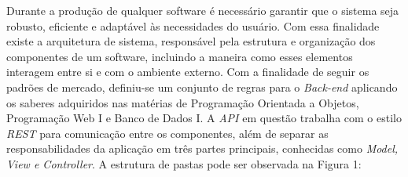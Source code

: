 Durante a produção de qualquer software é necessário garantir que o sistema seja robusto, eficiente e adaptável às necessidades do usuário. Com essa finalidade existe a arquitetura de sistema, responsável pela estrutura e organização dos componentes de um software, incluindo a maneira como esses elementos interagem entre si e com o ambiente externo. Com a finalidade de seguir os padrões de mercado, definiu-se um conjunto de regras para o \textit{Back-end} aplicando os saberes adquiridos nas matérias de Programação Orientada a Objetos, Programação Web I e Banco de Dados I. A \textit{API} em questão trabalha com o estilo \textit{REST} para comunicação entre os componentes, além de separar as responsabilidades da aplicação em três partes principais, conhecidas como \textit{Model, View e Controller}. A estrutura de pastas pode ser observada na Figura 1:
